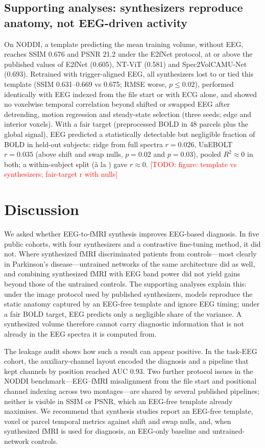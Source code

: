 \documentclass[11pt]{article}
\newcommand{\todo}[1]{\textcolor{red}{[TODO: #1]}}
\begin{document}
\subsection{Supporting analyses: synthesizers reproduce anatomy, not EEG-driven activity}\label{sec:res_fidelity}
On NODDI, a template predicting the mean training volume, without EEG, reaches SSIM 0.676 and PSNR 21.2 under the E2fNet protocol, at or above the published values of E2fNet (0.605), NT-ViT (0.581) and Spec2VolCAMU-Net (0.693).
Retrained with trigger-aligned EEG, all synthesizers lost to or tied this template (SSIM 0.631--0.669 vs 0.675; RMSE worse, $p\leq0.02$), performed identically with EEG indexed from the file start or with ECG alone, and showed no voxelwise temporal correlation beyond shifted or swapped EEG after detrending, motion regression and steady-state selection (three seeds; edge and interior voxels).
With a fair target (preprocessed BOLD in 48 parcels plus the global signal), EEG predicted a statistically detectable but negligible fraction of BOLD in held-out subjects: ridge from full spectra $r=0.026$, UnEBOLT $r=0.035$ (above shift and swap nulls, $p=0.02$ and $p=0.03$), pooled $R^2\approx0$ in both; a within-subject split (\`a la \citealp{mehta2025eegfmri}) gave $r\approx0$.
\todo{figure: template vs synthesizers; fair-target r with nulls}

\section{Discussion}
We asked whether EEG-to-fMRI synthesis improves EEG-based diagnosis.
In five public cohorts, with four synthesizers and a contrastive fine-tuning method, it did not.
Where synthesized fMRI discriminated patients from controls---most clearly in Parkinson's disease---untrained networks of the same architecture did as well, and combining synthesized fMRI with EEG band power did not yield gains beyond those of the untrained controls.
The supporting analyses explain this: under the image protocol used by published synthesizers, models reproduce the static anatomy captured by an EEG-free template and ignore EEG timing; under a fair BOLD target, EEG predicts only a negligible share of the variance.
A synthesized volume therefore cannot carry diagnostic information that is not already in the EEG spectra it is computed from.

The leakage audit shows how such a result can appear positive.
In the task-EEG cohort, the auxiliary-channel layout encoded the diagnosis and a pipeline that kept channels by position reached AUC 0.93.
Two further protocol issues in the NODDI benchmark---EEG--fMRI misalignment from the file start and positional channel indexing across two montages---are shared by several published pipelines; neither is visible in SSIM or PSNR, which an EEG-free template already maximises.
We recommend that synthesis studies report an EEG-free template, voxel or parcel temporal metrics against shift and swap nulls, and, when synthesized fMRI is used for diagnosis, an EEG-only baseline and untrained-network controls.
\end{document}
